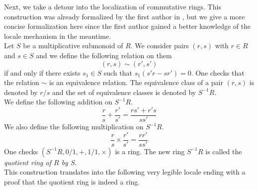 \documentclass[12pt]{scrartcl}
\begin{document}
Next, we take a detour into the localization of commutative rings. This construction was already formalized by the first author in \cite{Localization_Ring-AFP}, but we give a more concise formalization here since the first author gained a better knowledge of the locale mechanism in the meantime. \\
Let $S$ be a multiplicative submonoid of $R$. We consider pairs $(r, s)$ with $r \in R$ and $s \in S$ and we define the following relation on them
	\[
	(r, s) \sim (r', s')
	\]
if and only if there exists $s_1 \in S$ such that $s_1(s' r - s r') = 0$. One checks that the relation $\sim$ is an equivalence relation. The equivalence class of a pair $(r, s)$ is denoted by $r/s$ and the set of equivalence classes is denoted by $S^{-1} R$. \\
We define the following addition on $S^{-1} R$.
	\[
	\frac{r}{s} + \frac{r'}{s'} = \frac{r s' + r' s}{s s'}
	\]
We also define the following multiplication on $S^{-1} R$. 
	\[
	\frac{r}{s} \times \frac{r'}{s'} = \frac{r r'}{s s'}
	\]
One checks $(S^{-1} R, 0/1, +, 1/1, \times)$ is a ring. The new ring $S^{-1} R$ is called the \emph{quotient ring of $R$ by $S$}. \\
This construction translates into the following very legible locale ending with a proof that the quotient ring is indeed a ring.

\end{document}
